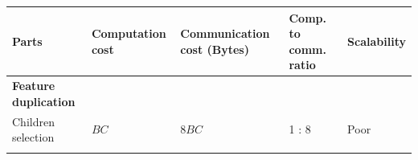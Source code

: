 \documentclass[10pt,oneside]{memoir}
\begin{document}
\begin{longtable}[]{@{}lllll@{}}
\toprule
\begin{minipage}[b]{0.18\columnwidth}\raggedright
Parts\strut
\end{minipage} & \begin{minipage}[b]{0.14\columnwidth}\raggedright
Computation cost\strut
\end{minipage} & \begin{minipage}[b]{0.25\columnwidth}\raggedright
Communication cost (Bytes)\strut
\end{minipage} & \begin{minipage}[b]{0.18\columnwidth}\raggedright
Comp. to comm. ratio\strut
\end{minipage} & \begin{minipage}[b]{0.10\columnwidth}\raggedright
Scalability\strut
\end{minipage}\tabularnewline
\midrule
\endhead
\begin{minipage}[t]{0.18\columnwidth}\raggedright
\textbf{Feature duplication}\strut
\end{minipage} & \begin{minipage}[t]{0.14\columnwidth}\raggedright
\strut
\end{minipage} & \begin{minipage}[t]{0.25\columnwidth}\raggedright
\strut
\end{minipage} & \begin{minipage}[t]{0.18\columnwidth}\raggedright
\strut
\end{minipage} & \begin{minipage}[t]{0.10\columnwidth}\raggedright
\strut
\end{minipage}\tabularnewline
\begin{minipage}[t]{0.18\columnwidth}\raggedright
Children selection\strut
\end{minipage} & \begin{minipage}[t]{0.14\columnwidth}\raggedright
\(BC\)\strut
\end{minipage} & \begin{minipage}[t]{0.25\columnwidth}\raggedright
\(8BC\)\strut
\end{minipage} & \begin{minipage}[t]{0.18\columnwidth}\raggedright
1 : 8\strut
\end{minipage} & \begin{minipage}[t]{0.10\columnwidth}\raggedright
Poor\strut
\end{minipage}\tabularnewline
\begin{minipage}[t]{0.18\columnwidth}\raggedright

\end{minipage}
\end{longtable}
\end{document}
